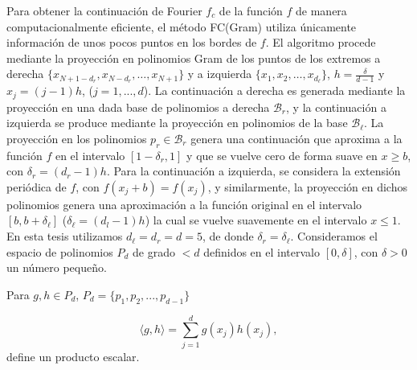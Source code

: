 Para obtener la continuación de Fourier $f_c$ de la función $f$ de manera computacionalmente eficiente, el método FC(Gram) utiliza únicamente información de unos pocos puntos en los bordes de $f$. 
El algoritmo procede mediante la proyección en polinomios Gram de los puntos de los extremos 
a derecha $\{x_{N+1-d_r},x_{N-d_r},\ldots, x_{N+1} \}$ y a izquierda $\{x_{1},x_{2},\ldots, x_{d_{\ell}} \}$, $h=\frac{\delta}{d-1}$ y $x_j=(j-1)h$, ($j=1,...,d$).
La continuación a derecha es generada mediante la proyección en una dada base de polinomios 
a derecha $\mathcal{B}_r$, y la continuación a izquierda se produce mediante la proyección 
en polinomios de la base $\mathcal{B}_{\ell}$. 
La proyección en los polinomios $p_r \in \mathcal{B}_r$ genera una continuación que 
aproxima a la función $f$ en el intervalo $[1-\delta_r,1]$ y que se vuelve cero de 
forma suave en $x\ge b$, con $\delta_r=(d_r-1)h$. Para la continuación a izquierda, se considera 
la extensión periódica de $f$, con $f(x_j+b)=f(x_j)$, y similarmente, la proyección 
en dichos polinomios genera una aproximación a la función original en el intervalo $[b,b+\delta_{\ell}]$ ($\delta_{\ell}=(d_l-1)h$) la cual se vuelve suavemente en el intervalo $x\leq 1$. 
En esta tesis utilizamos $d_{\ell}=d_r=d=5$, de donde $\delta_r=\delta_{\ell}$. 
Consideramos el espacio de polinomios $P_d$ de grado $<d$ definidos en el intervalo $[0,\delta]$, con $\delta>0$ un número pequeño.

Para $g,h\in P_d$, $P_d=\{p_1,p_2,...,p_{d-1}\}$

\begin{equation}
\langle g,h\rangle =\sum_{j=1}^{d}g(x_j)h(x_j),
\label{eq:dotpd}
\end{equation}
define un producto escalar.


